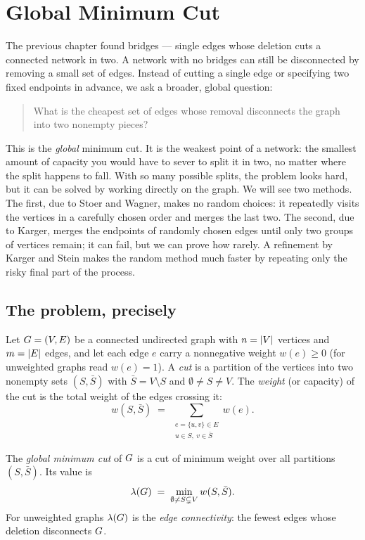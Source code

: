 \chapter{Global Minimum Cut}

The previous chapter found bridges --- single edges whose deletion cuts a connected network in two.
A network with no bridges can still be disconnected by removing a small set of edges.
Instead of cutting a single edge or specifying two fixed endpoints in advance, we ask a broader,
global question:

\begin{quote}
What is the cheapest set of edges whose removal disconnects the graph into two nonempty pieces?
\end{quote}

This is the \emph{global} minimum cut. It is the weakest point of a network: the smallest amount
of capacity you would have to sever to split it in two, no matter where the split happens to fall.
With so many possible splits, the problem looks hard, but it can be solved by working directly on the
graph. We will see two methods. The first, due to Stoer and Wagner, makes no random choices: it
repeatedly visits the vertices in a carefully chosen order and merges the last two. The second, due
to Karger, merges the endpoints of randomly chosen edges until only two groups of vertices remain;
it can fail, but we can prove how rarely. A refinement by Karger and Stein makes the random method
much faster by repeating only the risky final part of the process.

\chapterline

\section{The problem, precisely}

Let $G=(V,E)$ be a connected undirected graph with $n=\lvert V\rvert$ vertices and $m=\lvert E\rvert$ edges, and let each edge $e$ carry a nonnegative weight $w(e)\ge 0$ (for unweighted graphs read $w(e)=1$). A \emph{cut} is a partition of the vertices into two nonempty sets $(S,\bar S)$ with $\bar S = V\setminus S$ and $\emptyset \neq S \neq V$. The \emph{weight} (or capacity) of the cut is the total weight of the edges crossing it:
\[
  w(S,\bar S) \;=\; \sum_{\substack{e=\{u,v\}\in E\\ u\in S,\ v\in\bar S}} w(e).
\]

\begin{definition}\label{ch11:def-mincut}
The \emph{global minimum cut} of $G$ is a cut of minimum weight over all partitions $(S,\bar S)$. Its value is
\[
  \lambda(G) \;=\; \min_{\emptyset\neq S\subsetneq V} w(S,\bar S).
\]
For unweighted graphs $\lambda(G)$ is the \emph{edge connectivity}: the fewest edges whose deletion disconnects $G$.
\end{definition}


